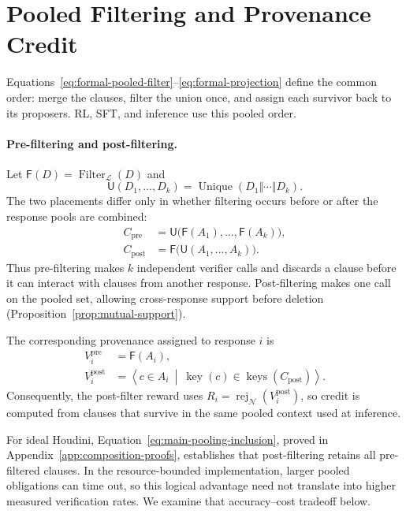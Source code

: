 \section{Pooled Filtering and Provenance Credit}
\label{app:houdini-order}

Equations~\eqref{eq:formal-pooled-filter}--\eqref{eq:formal-projection} define
the common order: merge the clauses, filter the union once, and assign each
survivor back to its proposers.  RL, SFT, and inference use this pooled order.

\paragraph{Pre-filtering and post-filtering.}
Let \(\mathsf F(D)=\operatorname{Filter}_{\mathcal L}(D)\) and
\[
  \mathsf U(D_1,\ldots,D_k)
  =\operatorname{Unique}(D_1\Vert\cdots\Vert D_k).
\]
The two placements differ only in whether filtering occurs before or after
the response pools are combined:
\begin{align}
  C_{\mathrm{pre}}
    &=\mathsf U\bigl(\mathsf F(A_1),\ldots,\mathsf F(A_k)\bigr),
    \label{eq:pre-filter-placement}\\
  C_{\mathrm{post}}
    &=\mathsf F\bigl(\mathsf U(A_1,\ldots,A_k)\bigr).
    \label{eq:post-filter-placement}
\end{align}
Thus pre-filtering makes \(k\) independent verifier calls and discards a
clause before it can interact with clauses from another response.
Post-filtering makes one call on the pooled set, allowing cross-response
support before deletion (Proposition~\ref{prop:mutual-support}).

The corresponding provenance assigned to response \(i\) is
\begin{align}
  V_i^{\mathrm{pre}}&=\mathsf F(A_i),\nonumber\\
  V_i^{\mathrm{post}}
    &=\left\langle c\in A_i\ \middle|\
      \operatorname{key}(c)\in\operatorname{keys}(C_{\mathrm{post}})
      \right\rangle.
  \label{eq:pre-post-provenance}
\end{align}
Consequently, the post-filter reward uses
\(R_i=\operatorname{rej}_{\mathcal N}(V_i^{\mathrm{post}})\), so credit is
computed from clauses that survive in the same pooled context used at
inference.

For ideal Houdini, Equation~\eqref{eq:main-pooling-inclusion}, proved in
Appendix~\ref{app:composition-proofs}, establishes that post-filtering
retains all pre-filtered clauses.  In the resource-bounded implementation,
larger pooled obligations can time out, so this logical advantage need not
translate into higher measured verification rates.  We examine that
accuracy--cost tradeoff below.

